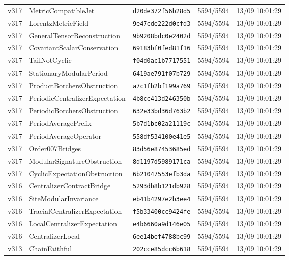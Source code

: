 \documentclass[11pt]{article}
\theoremstyle{definition}\newtheorem{deriv}{Derivation}
\begin{document}
{\begin{longtable}{@{}lllll@{}}
v317 & MetricCompatibleJet & \texttt{d20de372f56b28d5} & 5594/5594 & 13/09 10:01:29 \\
v317 & LorentzMetricField & \texttt{9e47cde222d0cfd3} & 5594/5594 & 13/09 10:01:29 \\
v317 & GeneralTensorReconstruction & \texttt{9b9208bdc0e2402d} & 5594/5594 & 13/09 10:01:29 \\
v317 & CovariantScalarConservation & \texttt{69183bf0fed81f16} & 5594/5594 & 13/09 10:01:29 \\
v317 & TailNotCyclic & \texttt{f04d0ac1b7717551} & 5594/5594 & 13/09 10:01:29 \\
v317 & StationaryModularPeriod & \texttt{6419ae791f07b729} & 5594/5594 & 13/09 10:01:29 \\
v317 & ProductBorchersObstruction & \texttt{a7c1fb2bf199a769} & 5594/5594 & 13/09 10:01:29 \\
v317 & PeriodicCentralizerExpectation & \texttt{4b8cc413d246350b} & 5594/5594 & 13/09 10:01:29 \\
v317 & PeriodicBorchersObstruction & \texttt{632e33bd36d763b2} & 5594/5594 & 13/09 10:01:29 \\
v317 & PeriodAveragePrefix & \texttt{5b7d1bc02a21119c} & 5594/5594 & 13/09 10:01:29 \\
v317 & PeriodAverageOperator & \texttt{558df534100e41e5} & 5594/5594 & 13/09 10:01:29 \\
v317 & Order007Bridges & \texttt{83d56e87453685ed} & 5594/5594 & 13/09 10:01:29 \\
v317 & ModularSignatureObstruction & \texttt{8d1197d5989171ca} & 5594/5594 & 13/09 10:01:29 \\
v317 & CyclicExpectationObstruction & \texttt{6b21047553efb3da} & 5594/5594 & 13/09 10:01:29 \\
v316 & CentralizerContractBridge & \texttt{5293db8b121db928} & 5594/5594 & 13/09 10:01:29 \\
v316 & SiteModularInvariance & \texttt{eb41b4297e2b3ee4} & 5594/5594 & 13/09 10:01:29 \\
v316 & TracialCentralizerExpectation & \texttt{f5b33400cc9424fe} & 5594/5594 & 13/09 10:01:29 \\
v316 & LocalCentralizerExpectation & \texttt{e4b6660a9d146e05} & 5594/5594 & 13/09 10:01:29 \\
v316 & CentralizerLocal & \texttt{6ee14bef4788bc99} & 5594/5594 & 13/09 10:01:29 \\
v313 & ChainFaithful & \texttt{202cce85dcc6b618} & 5594/5594 & 13/09 10:01:29 \\

\end{longtable}}
\end{document}
